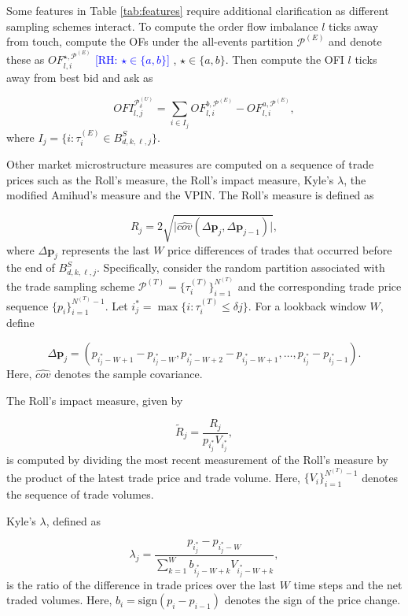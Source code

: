 \documentclass[10pt,a4paper,oneside]{article}
\newcommand{\rh}[1]{\textcolor{blue}{\textsf{[RH: #1]}}}
\providecommand{\DIFaddtex}[1]{{\protect\color{blue} \sf #1}} %
\providecommand{\DIFdeltex}[1]{{\protect\color{red} \scriptsize #1}} %
\providecommand{\DIFaddbegin}{} %
\providecommand{\DIFaddend}{} %
\providecommand{\DIFdelbegin}{} %
\providecommand{\DIFdelend}{} %
\providecommand{\DIFadd}[1]{\texorpdfstring{\DIFaddtex{#1}}{#1}} %
\providecommand{\DIFdel}[1]{\texorpdfstring{\DIFdeltex{#1}}{}} %
\newcommand{\DIFscaledelfig}{0.5}
\newlength{\DIFdelgraphicswidth} %
\newlength{\DIFdelgraphicsheight} %
\newcommand{\DIFaddincludegraphics}[2][]{{\color{blue}\fbox{\DIFOincludegraphics[#1]{#2}}}} %
\newcommand{\DIFdelincludegraphics}[2][]{%
\sbox{\DIFdelgraphicsbox}{\DIFOincludegraphics[#1]{#2}}%
\settoboxwidth{\DIFdelgraphicswidth}{\DIFdelgraphicsbox} %
\settoboxtotalheight{\DIFdelgraphicsheight}{\DIFdelgraphicsbox} %
\scalebox{\DIFscaledelfig}{%
\parbox[b]{\DIFdelgraphicswidth}{\usebox{\DIFdelgraphicsbox}\\[-\baselineskip] \rule{\DIFdelgraphicswidth}{0em}}\llap{\resizebox{\DIFdelgraphicswidth}{\DIFdelgraphicsheight}{%
\setlength{\unitlength}{\DIFdelgraphicswidth}%
\begin{picture}(1,1)%
\thicklines\linethickness{2pt} %
{\color[rgb]{1,0,0}\put(0,0){\framebox(1,1){}}}%
{\color[rgb]{1,0,0}\put(0,0){\line( 1,1){1}}}%
{\color[rgb]{1,0,0}\put(0,1){\line(1,-1){1}}}%
\end{picture}%
}\hspace*{3pt}}} %
} %
\DeclareRobustCommand{\DIFaddbegin}{\DIFOaddbegin \let\includegraphics\DIFaddincludegraphics} %
\DeclareRobustCommand{\DIFaddend}{\DIFOaddend \let\includegraphics\DIFOincludegraphics} %
\DeclareRobustCommand{\DIFdelbegin}{\DIFOdelbegin \let\includegraphics\DIFdelincludegraphics} %
\DeclareRobustCommand{\DIFdelend}{\DIFOaddend \let\includegraphics\DIFOincludegraphics} %
\begin{document}
Some features in Table \ref{tab:features} require additional clarification as different sampling schemes interact. To compute the order flow imbalance $l$ ticks away from touch, compute the OFs under the all-events partition $\mathcal{P}^{(E)}$ and denote these as $OF^{\star, \mathcal{P}^{(E)}}_{l,i}$\DIFdelbegin \DIFdel{\rh{$\star \in \{a, b\}$}}\DIFdelend \DIFaddbegin \DIFadd{, $\star \in \{a, b\}$}\DIFaddend . Then compute the OFI $l$ ticks away from best bid and ask as

$$
    OFI^{\mathcal{P}^{(U)}_{\delta}}_{l, j} = \sum_{i \in I_j} OF^{b, \mathcal{P}^{(E)}}_{l,i} - OF^{a, \mathcal{P}^{(E)}}_{l,i},
$$
where $I_j = \{ i : \tau^{(E)}_i \in B^S_{d,k,\ell,j} \}$.

Other market microstructure measures are computed on a sequence of trade prices such as the Roll's measure, the Roll's impact measure, Kyle's $\lambda$, the modified Amihud's measure and the VPIN. The Roll’s measure is defined as

\[
    R_j = 2 \sqrt{\Big| \hat{cov}(\Delta \mathbf{p}_j, \Delta \mathbf{p}_{j - 1}) \Big|},
\]
where \(\Delta \mathbf{p}_j\) represents the last \(W\) price differences of trades that occurred before the end of $B^S_{d,k,\ell,j}$. Specifically, consider the random partition associated with the trade sampling scheme \(\mathcal{P}^{(T)} = \{ \tau^{(T)}_i \}_{i=1}^{N^{(T)}}\) and the corresponding trade price sequence \(\{p_i\}_{i=1}^{N^{(T)}-1}\). Let \(i^*_j = \max\{i : \tau^{(T)}_i \leq \delta j\}\). For a lookback window \(W\), define

\[
    \Delta \mathbf{p}_j = (p_{i^*_j - W + 1} - p_{i^*_j - W}, p_{i^*_j - W + 2} - p_{i^*_j - W + 1}, \dots, p_{i^*_j} - p_{i^*_j - 1}).
\]
Here, \(\hat{cov}\) denotes the sample covariance.

The Roll’s impact measure, given by

\[
    \tilde{R}_j = \frac{R_j}{p_{i^*_j} V_{i^*_j}},
\]
is computed by dividing the most recent measurement of the Roll’s measure by the product of the latest trade price and trade volume. Here, \(\{ V_i \}_{i=1}^{N^{(T)}-1}\) denotes the sequence of trade volumes.

Kyle’s \(\lambda\), defined as

\[
    \lambda_j = \frac{p_{i^*_j} - p_{i^*_j - W}}{\sum_{k=1}^W b_{i^*_j - W + k} V_{i^*_j - W + k}},
\]
is the ratio of the difference in trade prices over the last \(W\) time steps and the net traded volumes. Here, \(b_i = \text{sign}(p_i - p_{i-1})\) denotes the sign of the price change.
\end{document}
